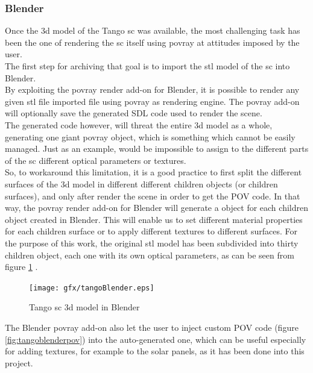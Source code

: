 \subsubsection{Blender}
Once the \acrshort{3d} model of the Tango \acrshort{sc} was available, the most challenging task has been the one of rendering the \acrshort{sc} itself using \acrshort{povray} at attitudes imposed by the user.\\
The first step for archiving that goal is to import the \acrshort{stl} model of the \acrshort{sc} into Blender.\\
By exploiting the \acrshort{povray} render add-on for Blender, it is possible to render any given \acrshort{stl} file imported file using \acrshort{povray} as rendering engine. The \acrshort{povray} add-on will optionally save the generated SDL code used to render the scene.\\
The generated code however, will threat the entire \acrshort{3d} model as a whole, generating one giant \acrshort{povray}  object, which is something which cannot be easily managed. Just as an example, would be impossible to assign to the different parts of the \acrshort{sc} different optical parameters or textures.\\
So, to workaround this limitation, it is a good practice to first split the different surfaces of the \acrshort{3d} model in different different children objects (or children surfaces), and only after render the scene in order to get the POV code. In that way, the \acrshort{povray} render add-on for Blender will generate a  object for each children object created in Blender.
This will enable us to set different material properties for each children surface or to apply different textures to different surfaces.
For the purpose of this work, the original \acrshort{stl} model has been subdivided into thirty children object, each one with its own optical parameters, as can be seen from figure \ref{fig:tangoblender} .

\begin{figure}[H]
\centering
\texttt{[image: gfx/tangoBlender.eps]}
\caption{Tango \acrshort{sc} \acrshort{3d} model in Blender}
\label{fig:tangoblender}
\end{figure}

The Blender \acrshort{povray} add-on also let the user to inject custom POV code (figure \ref{fig:tangoblenderpov}) into the auto-generated one, which can be useful especially for adding textures, for example to the solar panels, as it has been done into this project.

